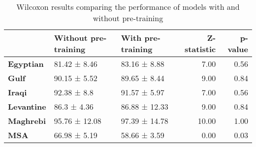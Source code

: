 \begin{table}
\caption{Wilcoxon results comparing the performance of models with and without pre-training}
\label{tab:wilcoxon}
\begin{tabular}{lllrr}
\toprule
 & Without pre-training & With pre-training & Z-statistic & p-value \\
\midrule
\textbf{Egyptian} & 81.42 ± 8.46 & 83.16 ± 8.88 & 7.00 & 0.56 \\
\textbf{Gulf} & 90.15 ± 5.52 & 89.65 ± 8.44 & 9.00 & 0.84 \\
\textbf{Iraqi} & 92.38 ± 8.8 & 91.57 ± 5.97 & 7.00 & 0.56 \\
\textbf{Levantine} & 86.3 ± 4.36 & 86.88 ± 12.33 & 9.00 & 0.84 \\
\textbf{Maghrebi} & 95.76 ± 12.08 & 97.39 ± 14.78 & 10.00 & 1.00 \\
\textbf{MSA} & 66.98 ± 5.19 & 58.66 ± 3.59 & 0.00 & 0.03 \\
\bottomrule
\end{tabular}
\end{table}
